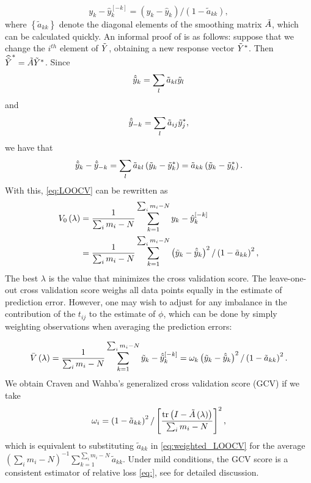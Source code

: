 \begin{equation} \label{eq:LOO_residual}
y_k - \hat{y}^{\left[-k\right]}_{k} = \left(y_k - \hat{y}_{k}\right)/\left(1-\tilde{a}_{kk}\right),
\end{equation}
\noindent
where $\left\{\tilde{a}_{kk}\right\}$ denote the diagonal elements of the smoothing matrix $\tilde{A}$, which can be calculated quickly. An informal proof of \label{eq:LOO_residual} is as follows: suppose that we change the $i^{th}$ element of $\tilde{Y}$, obtaining a new response vector $\tilde{Y}^*$. Then $\widehat{\tilde{Y}}^* = \tilde{A} \tilde{Y}^*$.  Since 
 \[
 \hat{\tilde{y}}_k = \sum_{l} \tilde{a}_{kl} \tilde{y}_l 
 \]
 \noindent 
 and 
 \[
 \hat{\tilde{y}}_{-k} = \sum_{l} \tilde{a}_{ij} \tilde{y}_j^*,
 \]
 \noindent
 we have that
 \[
 \hat{\tilde{y}}_k - \hat{\tilde{y}}_{-k} = \sum_l \tilde{a}_{kl} \left(\tilde{y}_k - \tilde{y}_k^*\right) = \tilde{a}_{kk} \left(\tilde{y}_k - \tilde{y}_k^*\right).  
\]
\noindent
With this, \ref{eq:LOOCV} can be rewritten as 
\begin{align*} 
V_0\left(\lambda\right) &= \frac{1}{{\sum_{i}m_i - N}} \sum_{k = 1}^{\sum_{i}m_i - N}  y_k - \hat{y}^{\left[-k\right]}_{k}\\
 &=  \frac{1}{{\sum_{i}m_i - N}} \sum_{k = 1}^{\sum_{i}m_i - N}  \left(\tilde{y}_k - \hat{\tilde{y}}_{k}\right)^2/\left(1-\tilde{a}_{kk}\right)^2 , 
\end{align*}
\noindent
The best $\lambda$ is the value that minimizes the cross validation score. The leave-one-out cross validation score weighs all data points equally in the estimate of prediction error. However, one may wish to adjust for any imbalance in the contribution of the $t_{ij}$ to the estimate of $\phi$, which can be done by simply weighting observations when averaging the prediction errors:
   
\begin{equation} \label{eq:weighted_LOOCV} 
\bar{V}\left(\lambda\right) = \frac{1}{\sum_{i}m_i - N} \sum_{k = 1}^{\sum_{i}m_i - N}  \tilde{y}_k - \hat{\tilde{y}}^{\left[-k\right]}_{k} = \omega_k \left(\tilde{y}_k - \hat{\tilde{y}}_{k}\right)^2/\left(1-\tilde{a}_{kk}\right)^2 . 
\end{equation}
\noindent
We obtain Craven and Wahba's generalized cross validation score (GCV) if we take
\[
\omega_i = \left(1 - \tilde{a}_{kk}\right)^2/\left[\frac{\mbox{tr}\left( I - \tilde{A}\left(\lambda\right)\right)}{\sum_{i}m_i - N}\right]^2,
\]
which is equivalent to substituting $\tilde{a}_{kk}$ in \ref{eq:weighted_LOOCV} for the average $\left(\sum_{i}m_i - N \right)^{-1} \sum_{k=1}^{\sum_{i}m_i - N} \tilde{a}_{kk}$. Under mild conditions, the GCV score is a consistent estimator of relative loss \ref{eq:}, see \citet{craven1978smoothing} for detailed discussion.
  
